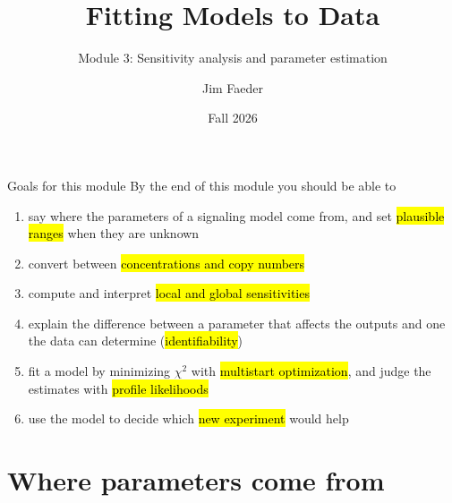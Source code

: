 \documentclass[aspectratio=169,10pt,t]{beamer}
\title{Fitting Models to Data}
\subtitle{Module 3: Sensitivity analysis and parameter estimation}
\author{Jim Faeder}
\institute{MSCBIO 2025 \textperiodcentered{} Introduction to Bioinformatics Programming in Python}
\date{Fall 2026}
\begin{document}
\begin{frame}[plain]
  \titlepage
\end{frame}


\newcommand{\bookchapters}{%
  \bookchapter{07-analysis}{7}{Analyzing models (sensitivity analysis)}
  \item Chapter 9: Parameter estimation {\color{fsGray}(in preparation)}}


\begin{frame}{Goals for this module}
  By the end of this module you should be able to
  \begin{enumerate}[<+->]
    \setlength\itemsep{1.5mm}
    \item say where the parameters of a signaling model come from, and set
          \hl{plausible ranges} when they are unknown
    \item convert between \hl{concentrations and copy numbers}
    \item compute and interpret \hl{local and global sensitivities}
    \item explain the difference between a parameter that affects the outputs and one
          the data can determine (\hl{identifiability})
    \item fit a model by minimizing $\chi^2$ with \hl{multistart optimization}, and judge
          the estimates with \hl{profile likelihoods}
    \item use the model to decide which \hl{new experiment} would help
  \end{enumerate}
\end{frame}

\section{Where parameters come from}
\end{document}
